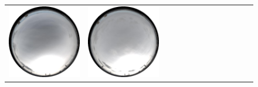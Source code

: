 \documentclass{report}
\begin{document}
\begin{figure}[!th]
\begin{tabular}{@{}rcccccccccccc@{}}
    \includegraphics[width=\customwidth]{./figures/database/20141108_130025.jpg} &
    \includegraphics[width=\customwidth]{./figures/database/20141108_133025.jpg} &

\end{tabular}
\end{figure}
\end{document}
